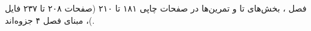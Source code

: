 فصل ، بخش‌های  تا  و تمرین‌ها در
صفحات چاپی ۱۸۱ تا ۲۱۰ (صفحات ۲۰۸ تا ۲۳۷ فایل )، مبنای فصل ۴ جزوه‌اند.
